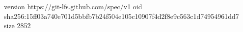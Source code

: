 version https://git-lfs.github.com/spec/v1
oid sha256:15ff03a740e701d5bbfb7b24f504e105c10907f4d2f8e9c563c1d74954961dd7
size 2852
